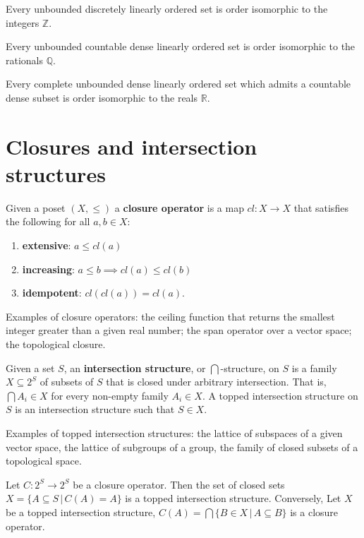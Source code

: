 \documentclass{bareminimum}
\begin{document}
\begin{prop}
	Every unbounded discretely linearly ordered set is order isomorphic to the integers $\mathbb{Z}$.
\end{prop}

\begin{prop}
	 Every unbounded countable dense linearly ordered set is order isomorphic to the rationals $\mathbb{Q}$.
\end{prop}

\begin{prop}
	Every complete unbounded dense linearly ordered set which admits a countable dense subset is order isomorphic to the reals $\mathbb{R}$.
\end{prop}

\section{Closures and intersection structures}

\begin{defn}
	Given a poset $(X, \leq)$  a \textbf{closure operator} is a map $cl : X \to X$ that satisfies the following for all $a,b \in X$:
	\begin{enumerate}
		\item \textbf{extensive}: $a \leq cl(a)$
		\item \textbf{increasing}: $a \leq b \implies cl(a) \leq cl(b)$
		\item \textbf{idempotent}: $cl(cl(a)) = cl(a)$.
	\end{enumerate}
\end{defn}

Examples of closure operators: the ceiling function that returns the smallest integer greater than a given real number; the span operator over a vector space; the topological closure.

\begin{defn}
	Given a set $S$,  an \textbf{intersection structure}, or $\bigcap$-structure, on $S$ is a family $X \subseteq 2^{S}$ of subsets of $S$ that is closed under arbitrary intersection. That is, $\bigcap A_i \in X$ for every non-empty family $A_i \in X$. A topped intersection structure on $S$ is an intersection structure such that $S \in X$.
\end{defn}

Examples of topped intersection structures: the lattice of subspaces of a given vector space, the lattice of subgroups of a group, the family of closed subsets of a topological space.

\begin{prop}
	Let $C : 2^{S} \to 2^{S}$ be a closure operator. Then the set of closed sets $X = \{ A \subseteq S \, | \, C(A) = A\}$ is a topped intersection structure. Conversely, Let $X$ be a topped intersection structure, $C(A) = \bigcap \{B \in X \, | \, A \subseteq B \}$ is a closure operator.
\end{prop}



\end{document}
